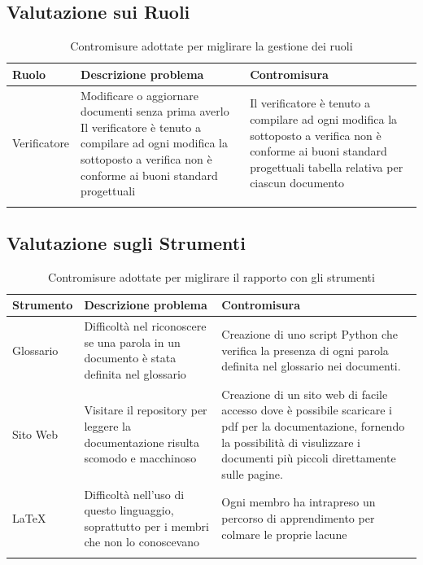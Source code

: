 \documentclass{article}
\begin{document}
\subsection{Valutazione sui Ruoli}
\begin{center}
    \begin{longtable}{|>{\centering\arraybackslash}p{}|>{\centering\arraybackslash}p{}|>{\centering\arraybackslash}p{}|}
        \hline
        \textbf{Ruolo} & \textbf{Descrizione problema} & \textbf{Contromisura} \\
        \hline
        Verificatore & Modificare o aggiornare documenti senza prima averlo Il verificatore è tenuto a compilare ad ogni modifica la sottoposto a verifica non è conforme ai buoni standard progettuali & Il verificatore è tenuto a compilare ad ogni modifica la sottoposto a verifica non è conforme ai buoni standard progettuali tabella relativa per ciascun documento\\
        \hline %
        \caption{Contromisure adottate per miglirare la gestione dei ruoli}
    \end{longtable}
\end{center}
\newpage
\subsection{Valutazione sugli Strumenti}
\begin{center}
    \begin{longtable}{|>{\centering\arraybackslash}p{}|>{\centering\arraybackslash}p{}|>{\centering\arraybackslash}p{}|}
        \hline
        \textbf{Strumento} & \textbf{Descrizione problema} & \textbf{Contromisura} \\
        \hline
        Glossario & Difficoltà nel riconoscere se una parola in un documento è stata definita nel glossario & Creazione di uno script Python che verifica la presenza di ogni parola definita nel glossario nei documenti.\\
        \hline
        Sito Web & Visitare il repository per leggere la documentazione risulta scomodo e macchinoso & Creazione di un sito web di facile accesso dove è possibile scaricare i pdf per la documentazione, fornendo la possibilità di visulizzare i documenti più piccoli direttamente sulle pagine. \\
        \hline
        LaTeX & Difficoltà nell'uso di questo linguaggio, soprattutto per i membri che non lo conoscevano & Ogni membro ha intrapreso un percorso di apprendimento per colmare le proprie lacune \\
        \hline %
        \caption{Contromisure adottate per miglirare il rapporto con gli strumenti}
    \end{longtable}
\end{center}
\end{document}
